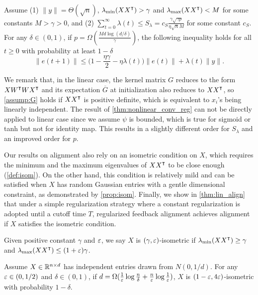 \begin{theorem}
\label{thm:lin_conv}
Assume \textnormal{(1)}  $\|y\| = \Theta(\sqrt n)$, $\lambda_{\min}(XX\transpose)>\gamma$ and $\lambda_{\max}(XX\transpose)<M$ for some constants $M>\gamma>0$, and \textnormal{(2)} $\sum_{t=0}^\infty \lambda(t) \leq  S_\lambda = c_{S}\frac{\gamma\sqrt{\gamma p}}{\eta\sqrt{n}M}$ for some constant $c_{S}$.
For any $\delta\in(0,1)$, if $p = \Omega(\frac{Md\log(d/\delta)}{\gamma})$, the following inequality holds for all $t\geq 0$ with probability at least $1-\delta$
\begin{equation}
\label{eq:reg_error_bd}
\|e(t+1)\|\leq \big(1-\frac{\eta\gamma}{2}-\eta\lambda(t)\big)\|e(t)\| + \lambda(t)\|y\|.
\end{equation}
\end{theorem}

We remark that, in the linear case, the kernel matrix $G$ reduces to the form $X W\transpose W X\transpose$ and its expectation $\overline{G}$ at initialization also reduces to $X X\transpose$, so \cref{assump:G} holds if $XX\transpose$ is positive definite, which is equivalent to $x_i$'s being linearly independent. The result of \cref{thm:nonlinear_conv_reg} can not be directly applied to linear case since we assume $\psi$ is bounded, which is true for sigmoid or tanh but not for identity map. This results in a slightly different order for $S_\lambda$ and an improved order for $p$.

Our results on alignment also rely on an isometric condition on $X$, which requires the minimum and the maximum eigenvalues of $XX\transpose$ to be close enough (\cf \cref{def:isom}). On the other hand, this condition is relatively mild and can be satisfied when $X$ has random Gaussian entries with a gentle dimensional constraint, as demonstrated by \cref{prop:isom}. Finally, we show in \cref{thm:lin_align} that under a simple regularization strategy where a constant regularization is adopted until a cutoff time $T$, regularized feedback alignment achieves alignment if $X$ satisfies the isometric condition.
{}
\begin{definition}
\label{def:isom}
Given positive constant $\gamma$ and $\varepsilon$, we say $X$ is $(\gamma, \varepsilon)$-isometric if
$\lambda_{\min}(XX\transpose)\geq\gamma$ and $\lambda_{\max}(XX\transpose)\leq(1+\eps)\gamma$.
\end{definition}

\begin{proposition}
\label{prop:isom}
Assume $X\in\mathbb{R}^{n\times d}$ has independent entries drawn from $N(0,1/d)$. For any $\varepsilon \in (0,1/2)$ and $\delta \in (0,1)$, if $d=\Omega(\frac{1}{\varepsilon}\log\frac{n}{\delta}+\frac{n}{\varepsilon}\log \frac{1}{\varepsilon})$, $X$ is $(1-\varepsilon, 4\varepsilon)$-isometric with probability $1-\delta$.
\end{proposition}

